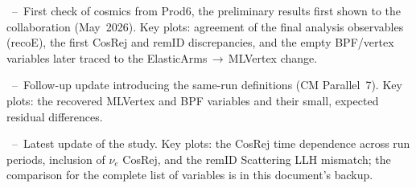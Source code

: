 \documentclass{article}
\begin{document}
\noindent\cite{docdb-69724}~--~First check of cosmics from Prod6, the preliminary
results first shown to the collaboration (May~2026). Key plots: agreement of the
final analysis observables (recoE), the first CosRej and remID discrepancies, and
the empty BPF/vertex variables later traced to the ElasticArms\,$\rightarrow$\,MLVertex change.

\noindent\cite{docdb-70051}~--~Follow-up update introducing the same-run
definitions (CM Parallel~7). Key plots: the recovered MLVertex and BPF variables
and their small, expected residual differences.

\noindent\cite{docdb-70174}~--~Latest update of the study. Key plots: the CosRej
time dependence across run periods, inclusion of $\nu_e$ CosRej, and the remID Scattering LLH
mismatch; the comparison for the complete list of variables is in this document's backup.



\end{document}
